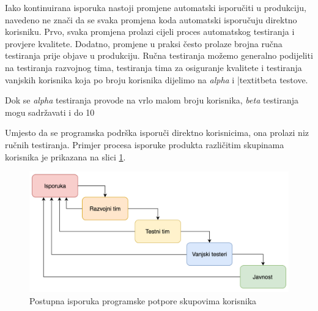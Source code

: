 \documentclass[times, utf8, diplomski, numeric]{fer}
\begin{document}
Iako kontinuirana isporuka nastoji promjene automatski isporučiti u produkciju, navedeno ne znači da se svaka promjena koda automatski isporučuju direktno korisniku. Prvo, svaka promjena prolazi cijeli proces automatskog testiranja i provjere kvalitete. Dodatno, promjene u praksi često prolaze brojna ručna testiranja prije objave u produkciju. Ručna testiranja možemo generalno podijeliti na testiranja razvojnog tima, testiranja tima za osiguranje kvalitete i testiranja vanjskih korisnika koja po broju korisnika dijelimo na \textit{alpha} i |textit{beta} testove.

Dok se \textit{alpha} testiranja provode na vrlo malom broju korisnika, \textit{beta} testiranja mogu sadržavati i do 10%

Umjesto da se programska podrška isporuči direktno korisnicima, ona prolazi niz ručnih testiranja. Primjer procesa isporuke produkta različitim skupinama korisnika je prikazana na slici \ref{fig:DeploymentStages}.

\begin{figure}[h]
\centering
\includegraphics[scale=0.6]{DeploymentStages}
\caption{Postupna isporuka programske potpore skupovima korisnika}
\label{fig:DeploymentStages}
\end{figure}
\end{document}
